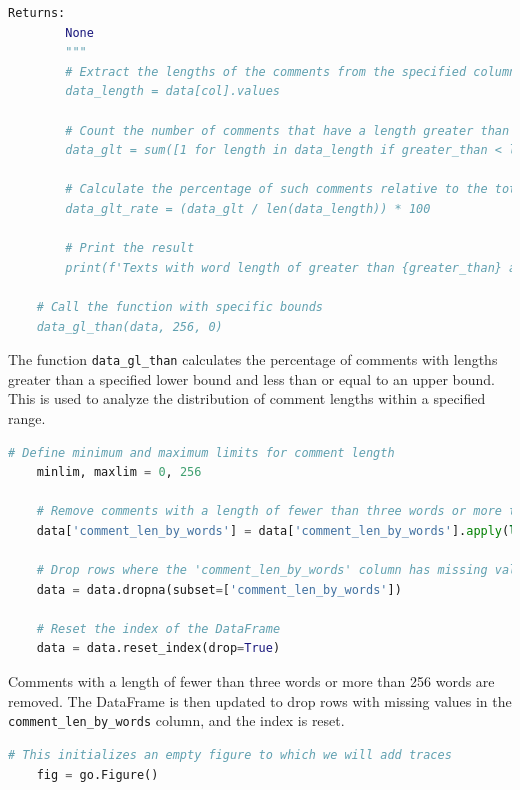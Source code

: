 \documentclass{solutionclass} %
\begin{document}
\begin{solution}
\begin{lstlisting}[language=Python, basicstyle=\ttfamily\footnotesize, keywordstyle=\color{blue}, commentstyle=\color{gray}]
        Returns:
        None
        """
        # Extract the lengths of the comments from the specified column
        data_length = data[col].values
    
        # Count the number of comments that have a length greater than 'greater_than' and less than or equal to 'less_than'
        data_glt = sum([1 for length in data_length if greater_than < length <= less_than])
    
        # Calculate the percentage of such comments relative to the total number of comments
        data_glt_rate = (data_glt / len(data_length)) * 100
    
        # Print the result
        print(f'Texts with word length of greater than {greater_than} and less than {less_than} includes {data_glt_rate:.2f}% of the whole!')
    
    # Call the function with specific bounds
    data_gl_than(data, 256, 0)
    \end{lstlisting}
    
    The function \texttt{data\_gl\_than} calculates the percentage of comments with lengths greater than a specified lower bound and less than or equal to an upper bound. This is used to analyze the distribution of comment lengths within a specified range.
    
    \begin{lstlisting}[language=Python, basicstyle=\ttfamily\footnotesize, keywordstyle=\color{blue}, commentstyle=\color{gray}]
    # Define minimum and maximum limits for comment length
    minlim, maxlim = 0, 256
    
    # Remove comments with a length of fewer than three words or more than 256 words
    data['comment_len_by_words'] = data['comment_len_by_words'].apply(lambda len_t: len_t if minlim < len_t <= maxlim else None)
    
    # Drop rows where the 'comment_len_by_words' column has missing values
    data = data.dropna(subset=['comment_len_by_words'])
    
    # Reset the index of the DataFrame
    data = data.reset_index(drop=True)
    \end{lstlisting}
    
    Comments with a length of fewer than three words or more than 256 words are removed. The DataFrame is then updated to drop rows with missing values in the \texttt{comment\_len\_by\_words} column, and the index is reset.
    
    \begin{lstlisting}[language=Python, basicstyle=\ttfamily\footnotesize, keywordstyle=\color{blue}, commentstyle=\color{gray}]
    # This initializes an empty figure to which we will add traces
    fig = go.Figure()
    

\end{lstlisting}
\end{solution}
\end{document}
